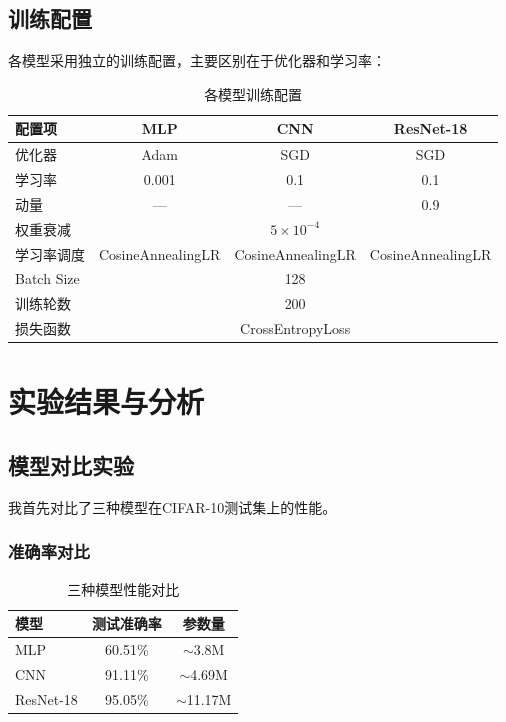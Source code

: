 \documentclass[12pt,a4paper]{article}
\begin{document}
\subsection{训练配置}

各模型采用独立的训练配置，主要区别在于优化器和学习率：

\begin{table}[H]
    \centering
    \caption{各模型训练配置}
    \label{tab:training_config}
    \begin{tabular}{lccc}
        \toprule
        \textbf{配置项} & \textbf{MLP} & \textbf{CNN} & \textbf{ResNet-18} \\
        \midrule
        优化器 & Adam & SGD & SGD \\
        学习率 & 0.001 & 0.1 & 0.1 \\
        动量 & --- & --- & 0.9 \\
        权重衰减 & \multicolumn{3}{c}{$5 \times 10^{-4}$} \\
        学习率调度 & CosineAnnealingLR & CosineAnnealingLR & CosineAnnealingLR \\
        Batch Size & \multicolumn{3}{c}{128} \\
        训练轮数 & \multicolumn{3}{c}{200} \\
        损失函数 & \multicolumn{3}{c}{CrossEntropyLoss} \\
        \bottomrule
    \end{tabular}
\end{table}

\section{实验结果与分析}

\subsection{模型对比实验}

我首先对比了三种模型在CIFAR-10测试集上的性能。

\subsubsection{准确率对比}

\begin{table}[H]
    \centering
    \caption{三种模型性能对比}
    \label{tab:model_comparison}
    \begin{tabular}{lcc}
        \toprule
        \textbf{模型} & \textbf{测试准确率} & \textbf{参数量} \\
        \midrule
MLP & 60.51\% & $\sim$3.8M \\
CNN & 91.11\% & $\sim$4.69M \\
        ResNet-18 & 95.05\% & $\sim$11.17M \\
        \bottomrule
    \end{tabular}
\end{table}
\end{document}
